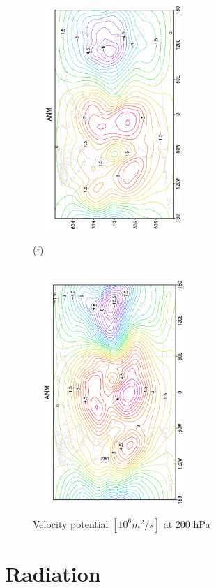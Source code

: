 \documentclass[12pt,a4paper,twoside,openright,headinclude,liststotoc,bibtotoc]{scrreprt}
\begin{document}
\begin{figure}[H]
{\includegraphics[height=8.5cm,width=6.1cm,angle=-90]
{eps/finaltmvelopot149_200.eps}
}
\parbox{8.5cm}{\hspace{0.25cm}\begin{scriptsize}(f)\end{scriptsize} \vspace{-0.8cm} \\
\includegraphics[height=8.5cm,width=6.1cm,angle=-90]
{eps/finaltmt21_ERA40VELPOT200.eps}
}
\caption[Velocity potential at 200 hPa]{Velocity potential $[10^{6}m^{2}/s]$ at 200 hPa}
\label{img:velopot200}
\end{figure}

\vspace{-0.4cm}
\chapter{Radiation}
\vspace{-0.4cm}
\end{document}
